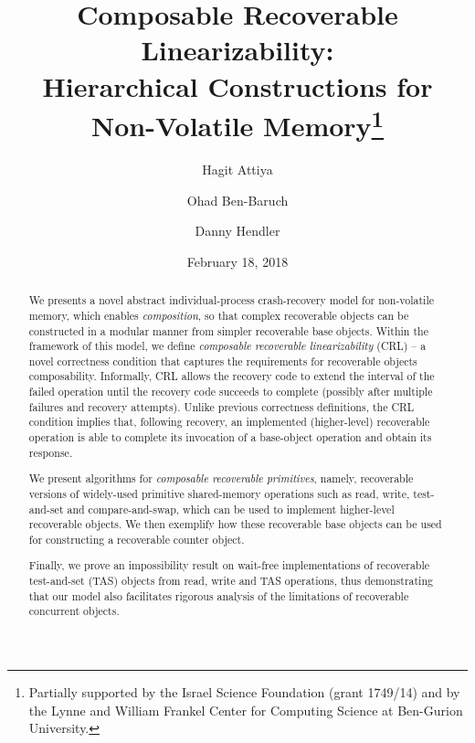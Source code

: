 \begin{titlepage}
	
	\title{Composable Recoverable Linearizability:\\
            Hierarchical Constructions for Non-Volatile Memory\thanks{
		Partially supported by the Israel Science Foundation
		(grant 1749/14) and by the Lynne and William Frankel Center for Computing Science at Ben-Gurion University.}}
	
	
	\author[1]{Hagit Attiya}
	\author[2]{Ohad Ben-Baruch}
	\author[3]{Danny Hendler}
	
    \date{February 18, 2018}
	\maketitle

\begin{abstract}
We presents a novel abstract individual-process crash-recovery model for non-volatile memory, which enables \emph{composition}, so that complex recoverable objects can be constructed in a modular manner from simpler recoverable base objects. Within the framework of this model, we define \emph{composable recoverable linearizability} (CRL) -- a novel correctness condition that captures the requirements for recoverable objects composability. Informally, CRL allows the recovery code to extend the interval of the failed operation until the recovery code succeeds to complete
(possibly after multiple failures and recovery attempts).
Unlike previous correctness definitions, the CRL condition implies that,
following recovery, an implemented (higher-level) recoverable operation
is able to complete its invocation of a base-object operation and obtain its response.

We present algorithms for \emph{composable recoverable primitives},
namely, recoverable versions of widely-used primitive shared-memory
operations such as read, write, test-and-set and compare-and-swap,
which can be used to implement higher-level recoverable objects. We then  
exemplify how these recoverable base objects can be used for constructing a 
recoverable counter object. 

Finally, we prove an impossibility result on wait-free implementations of recoverable test-and-set (TAS) objects from read, write and TAS operations, thus demonstrating that our model also facilitates
rigorous analysis of the limitations of recoverable concurrent objects.
\end{abstract}




\maketitle \thispagestyle{empty}
\end{titlepage} 